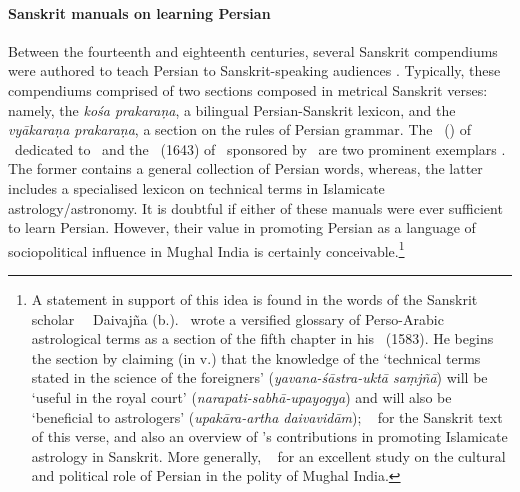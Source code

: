 \paragraph{Sanskrit manuals on learning Persian} 
Between the fourteenth and eighteenth centuries, several Sanskrit compendiums were authored to teach Persian to Sanskrit-speaking audiences \parencites[\eg \vid][]{SarmaSanskritmanuals, Truschkepersiansanskritlexica}. Typically, these compendiums comprised of two sections composed in metrical Sanskrit verses: namely, the \textit{kośa prakaraṇa}, a bilingual Persian-Sanskrit lexicon, and the \textit{vyākaraṇa prakaraṇa}, a section on the rules of Persian grammar. The \Parasiprakasa\ () of \Krsnadasa\ dedicated to \Akbar\ and the \SamskrtaParasikaPadaPrakasa\ (1643) of \VedangarayaMalajit\ sponsored by \Shahjahan\ are two prominent exemplars \parencite[\vid][]{SarmaSanskritPersianLexica}. The former contains a general collection of Persian words, whereas, the latter includes a specialised lexicon on technical terms in Islamicate astrology/astronomy. It is doubtful if either of these manuals were ever sufficient to learn Persian. However, their value in promoting Persian as a language of sociopolitical influence in Mughal India is certainly conceivable.\footnote{A statement in support of this idea is found in the words of the Sanskrit scholar \Pandita\ \Suryadasa\ Daivajña (b.). \Suryadasa\ wrote a versified glossary of Perso-Arabic astrological terms as a section of the fifth chapter in his \Siddhantasamhitasarasamuccaya\ (1583). He begins the section by claiming (in v.) that the knowledge of the `technical terms stated in the science of the foreigners'  (\textit{yavana-śāstra-uktā saṃjñā}) will be `useful in the royal court' (\textit{narapati-sabhā-upayogya}) and will also be `beneficial to astrologers' (\textit{upakāra-artha daivavidām}); \vid\ \textcite[p.--330]{MinkowskiSuryadas} for the Sanskrit text of this verse, and also an overview of \Suryadasa's contributions in promoting Islamicate astrology in Sanskrit. More generally, \vid\ \textcite{AlamPersian2003} for an excellent study on the cultural and political role of Persian in the polity of Mughal India.}  


